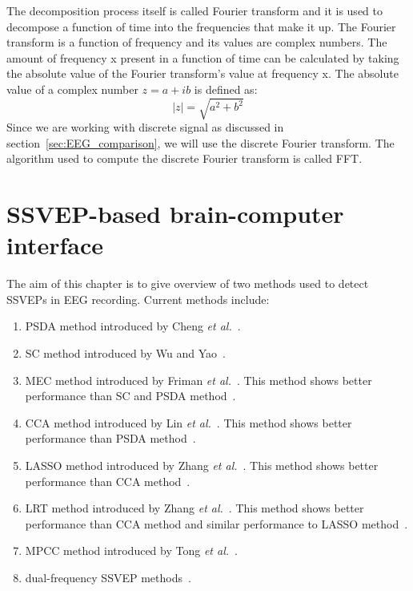 The decomposition process itself is called Fourier transform and it is used to decompose a function of time into the frequencies that make it up. The Fourier transform is a function of frequency and its values are complex numbers. The amount of frequency x present in a function of time can be calculated by taking the absolute value of the Fourier transform's value at frequency x. The absolute value of a complex number $z=a+ib$ is defined as:
\begin{equation}
	|z|=\sqrt{a^2+b^2}
\end{equation}
Since we are working with discrete signal as discussed in section~\ref{sec:EEG_comparison}, we will use the discrete Fourier transform. The algorithm used to compute the discrete Fourier transform is called \gls{FFT}.

\section{SSVEP-based brain-computer interface}
\label{sec:SSVEP_detection}
The aim of this chapter is to give overview of two methods used to detect \glspl{SSVEP} in \gls{EEG} recording. Current methods include:
\begin{enumerate}
	\item \gls{PSDA} method introduced by Cheng \emph{et al.}~\cite{psda}.
	\item \gls{SC} method introduced by Wu and Yao~\cite{sc}.
	\item \gls{MEC} method introduced by Friman \emph{et al.}~\cite{mec}. This method shows better performance than \gls{SC} and \gls{PSDA} method~\cite{mec_comparison}.
	\item \gls{CCA} method introduced by Lin \emph{et al.}~\cite{cca_lin}. This method shows better performance than \gls{PSDA} method~\cite{bin2009cca}.
	\item \gls{LASSO} method introduced by Zhang \emph{et al.}~\cite{LASSO}. This method shows better performance than \gls{CCA} method~\cite{LASSO}.
	\item \gls{LRT} method introduced by Zhang \emph{et al.}~\cite{LRT}. This method shows better performance than \gls{CCA} method and similar performance to \gls{LASSO} method~\cite{LRT}.
	\item \gls{MPCC} method introduced by Tong \emph{et al.}~\cite{MPCC}.
	\item dual-frequency \gls{SSVEP} methods~\cite{dual1, dual2}.
\end{enumerate}

